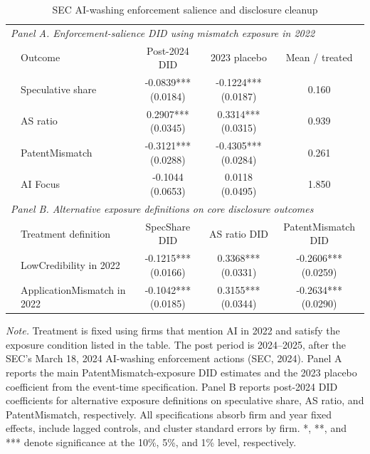 \begin{table}[!htbp]
\centering
\caption{SEC AI-washing enforcement salience and disclosure cleanup}
\label{tab:sec_enforcement_did_v32}
\small
\begin{tabular}{llccc}
\hline
\multicolumn{5}{l}{\textit{Panel A. Enforcement-salience DID using mismatch exposure in 2022}} \\
 & Outcome & Post-2024 DID & 2023 placebo & Mean / treated \\
\hline
 & Speculative share & -0.0839*** (0.0184) & -0.1224*** (0.0187) & 0.160 \\
 & AS ratio & 0.2907*** (0.0345) & 0.3314*** (0.0315) & 0.939 \\
 & PatentMismatch & -0.3121*** (0.0288) & -0.4305*** (0.0284) & 0.261 \\
 & AI Focus & -0.1044 (0.0653) & 0.0118 (0.0495) & 1.850 \\
\hline
\multicolumn{5}{l}{\textit{Panel B. Alternative exposure definitions on core disclosure outcomes}} \\
 & Treatment definition & SpecShare DID & AS ratio DID & PatentMismatch DID \\
\hline
 & LowCredibility in 2022 & -0.1215*** (0.0166) & 0.3368*** (0.0331) & -0.2606*** (0.0259) \\
 & ApplicationMismatch in 2022 & -0.1042*** (0.0185) & 0.3155*** (0.0344) & -0.2634*** (0.0290) \\
\hline
\end{tabular}
\begin{flushleft}
\footnotesize \textit{Note.} Treatment is fixed using firms that mention AI in 2022 and satisfy the exposure condition listed in the table. The post period is 2024--2025, after the SEC's March 18, 2024 AI-washing enforcement actions (SEC, 2024). Panel A reports the main PatentMismatch-exposure DID estimates and the 2023 placebo coefficient from the event-time specification. Panel B reports post-2024 DID coefficients for alternative exposure definitions on speculative share, AS ratio, and PatentMismatch, respectively. All specifications absorb firm and year fixed effects, include lagged controls, and cluster standard errors by firm. *, **, and *** denote significance at the 10\%, 5\%, and 1\% level, respectively.
\end{flushleft}
\end{table}
